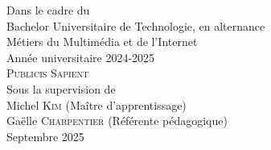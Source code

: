 \begin{titlepage}
{\large Dans le cadre du}\\[0.5cm]
{\large Bachelor Universitaire de Technologie, en alternance}\\[0.25cm]
{\large Métiers du Multimédia et de l'Internet}\\[0.25cm]
{\large Année universitaire 2024-2025}\\[2cm]

{\huge\textsc{Publicis Sapient}}\\[0.5cm]
{\large Sous la supervision de}\\[0.25cm]
{\large Michel \textsc{Kim} (Maître d’apprentissage)}\\[0.25cm]
{\large Gaëlle \textsc{Charpentier} (Référente pédagogique)}\\[0.5cm]

\vfill
{\large Septembre 2025}

\end{titlepage}
\restoregeometry
